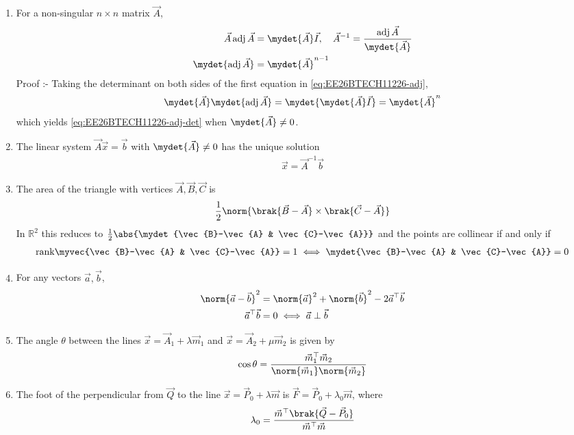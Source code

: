 \begin{enumerate}[label=\thesubsection.\arabic*, ref=\thesubsection.\theenumi]
\item For a non-singular $n \times n$ matrix $\vec{A}$,
\begin{align}
	\vec{A}\,\text{adj}\,\vec{A} &= \mydet{\vec{A}}\vec{I}, \quad
	\vec{A}^{-1} = \frac{\text{adj}\,\vec{A}}{\mydet{\vec{A}}}
	\label{eq:EE26BTECH11226-adj}
	\\
	\mydet{\text{adj}\,\vec{A}} &= \mydet{\vec{A}}^{n-1}
	\label{eq:EE26BTECH11226-adj-det}
\end{align}
Proof :- Taking the determinant on both sides of the first equation in
\eqref{eq:EE26BTECH11226-adj},
\begin{align}
	\mydet{\vec{A}}\mydet{\text{adj}\,\vec{A}} = \mydet{\mydet{\vec{A}}\vec{I}} = \mydet{\vec{A}}^{n}
\end{align}
which yields \eqref{eq:EE26BTECH11226-adj-det} when $\mydet{\vec{A}} \ne 0$.
\item The linear system $\vec{A}\vec{x} = \vec{b}$ with $\mydet{\vec{A}} \ne 0$ has the unique solution
\begin{align}
	\vec{x} = \vec{A}^{-1}\vec{b}
	\label{eq:EE26BTECH11226-linsys}
\end{align}
\item The area of the triangle with vertices $\vec{A}, \vec{B}, \vec{C}$ is
\begin{align}
	\frac{1}{2}\norm{\brak{\vec{B}-\vec{A}}\times\brak{\vec{C}-\vec{A}}}
	\label{eq:EE26BTECH11226-area}
\end{align}
In $\mathbb{R}^2$ this reduces to $\frac{1}{2}\abs{\mydet{\vec{B}-\vec{A} & \vec{C}-\vec{A}}}$ and the points are collinear if and only if
\begin{align}
	\text{rank}\myvec{\vec{B}-\vec{A} & \vec{C}-\vec{A}} = 1
	\iff
	\mydet{\vec{B}-\vec{A} & \vec{C}-\vec{A}} = 0
	\label{eq:EE26BTECH11226-collinear}
\end{align}
\item For any vectors $\vec{a}, \vec{b}$,
\begin{align}
	\norm{\vec{a}-\vec{b}}^2 &= \norm{\vec{a}}^2 + \norm{\vec{b}}^2 - 2\vec{a}^{\top}\vec{b}
	\label{eq:EE26BTECH11226-norm-id}
	\\
	\vec{a}^{\top}\vec{b} &= 0 \iff \vec{a} \perp \vec{b}
	\label{eq:EE26BTECH11226-ortho}
\end{align}
\item The angle $\theta$ between the lines $\vec{x} = \vec{A}_1 + \lambda\vec{m}_1$ and $\vec{x} = \vec{A}_2 + \mu\vec{m}_2$ is given by
\begin{align}
	\cos\theta = \frac{\vec{m}_1^{\top}\vec{m}_2}{\norm{\vec{m}_1}\norm{\vec{m}_2}}
	\label{eq:EE26BTECH11226-angle}
\end{align}
\item The foot of the perpendicular from $\vec{Q}$ to the line $\vec{x} = \vec{P}_0 + \lambda\vec{m}$ is $\vec{F} = \vec{P}_0 + \lambda_0\vec{m}$, where
\begin{align}
	\lambda_0 = \frac{\vec{m}^{\top}\brak{\vec{Q}-\vec{P}_0}}{\vec{m}^{\top}\vec{m}}
	\label{eq:EE26BTECH11226-foot}
\end{align}


\end{enumerate}
